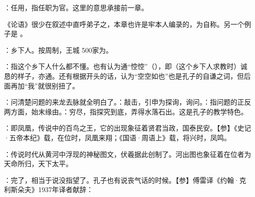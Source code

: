 {
\begin{lyitemize}
\item {}：任用，指任职为官。这里的意思承接前一章。
\end{lyitemize}
《论语》很少在叙述中直呼弟子之，本章也许是牢本人编录的，为自称。另一个例子是  。
}
{}


{
\item {}：乡下人。按周制，王城 500家为。
\item {}：指这个乡下人什么都不懂。也有认为通“悾悾”（），即（这个乡下人求教时）诚恳的样子，亦通。还有根据开头的话，认为“空空如也”也是孔子的自谦之词，但后面再加“我”就很别扭了。
\item {}：问清楚问题的来龙去脉就全明白了。：敲击，引申为探询，询问。：指问题的正反两方面，始末缘由。：穷尽，指探究到底，弄得水落石出。这是孔子的教学特色。
}
{}


{
\item {}：即凤凰，传说中的百鸟之王，它的出现象征着贤君当政，国泰民安。【参】《史记·五帝本纪》载，在位时，凤凰来翔；《国语·周语上》载，将兴时，凤鸣。
\item {}：传说时代从黄河中浮现的神秘图文，伏羲据此创制了。河出图也象征着在位者为天命所归，天下太平。
\item {}：完了，相当于说没指望了。孔子也有说丧气话的时候。【参】傅雷译《约翰·克利斯朵夫》1937年译者献辞： %
}
{}


